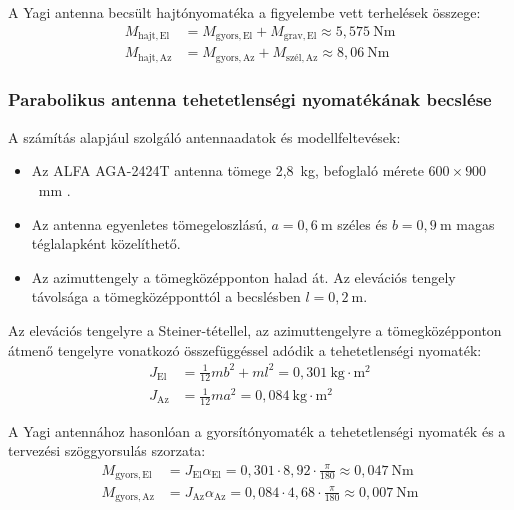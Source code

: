 A Yagi antenna becsült hajtónyomatéka a figyelembe vett
terhelések összege:
\begin{align}
    M_{\mathrm{hajt,El}} &= M_{\mathrm{gyors,El}}+M_{\mathrm{grav,El}}
    \approx 5{,}575~\mathrm{Nm} \\
    M_{\mathrm{hajt,Az}} &= M_{\mathrm{gyors,Az}}+M_{\mathrm{szél,Az}}
    \approx 8{,}06~\mathrm{Nm}
\end{align}



\subsubsection{Parabolikus antenna tehetetlenségi nyomatékának becslése}
A számítás alapjául szolgáló antennaadatok és modellfeltevések:
\begin{itemize}
    \item Az ALFA AGA-2424T antenna tömege 2,8~kg,
          befoglaló mérete $600 \times 900$~mm
          \cite{parabolic-antenna}.
    \item Az antenna egyenletes tömegeloszlású,
          $a=0{,}6~\mathrm{m}$ széles és
          $b=0{,}9~\mathrm{m}$ magas téglalapként közelíthető.
    \item Az azimuttengely a tömegközépponton halad át.
          Az elevációs tengely távolsága a tömegközépponttól
          a becslésben $l=0{,}2~\mathrm{m}$.
\end{itemize}

Az elevációs tengelyre a Steiner-tétellel, az
azimuttengelyre a tömegközépponton átmenő tengelyre
vonatkozó összefüggéssel adódik a tehetetlenségi nyomaték:
\begin{align}
    J_{\mathrm{El}} &= \frac{1}{12}mb^2 + ml^2
                    = 0{,}301~\mathrm{kg\cdot m^2} \\
    J_{\mathrm{Az}} &= \frac{1}{12}ma^2
                    = 0{,}084~\mathrm{kg\cdot m^2}
\end{align}

A Yagi antennához hasonlóan a gyorsítónyomaték
a tehetetlenségi nyomaték és a tervezési szöggyorsulás
szorzata:
\begin{align}
    M_{\mathrm{gyors,El}} &= J_{\mathrm{El}}\alpha_{\mathrm{El}}
    = 0{,}301\cdot 8{,}92\cdot\frac{\pi}{180}
    \approx 0{,}047~\mathrm{Nm} \\
    M_{\mathrm{gyors,Az}} &= J_{\mathrm{Az}}\alpha_{\mathrm{Az}}
    = 0{,}084\cdot 4{,}68\cdot\frac{\pi}{180}
    \approx 0{,}007~\mathrm{Nm}
\end{align}


